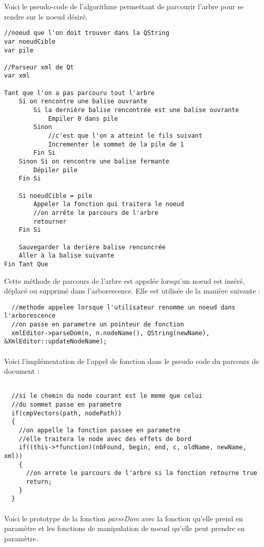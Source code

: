 Voici le pseudo-code de l'algorithme permettant de parcourir l'arbre pour se rendre sur le noeud désiré.

\begin{verbatim}
//noeud que l'on doit trouver dans la QString
var noeudCible
var pile

//Parseur xml de Qt
var xml

Tant que l'on a pas parcouru tout l'arbre
    Si on rencontre une balise ouvrante
        Si la dernière balise rencontrée est une balise ouvrante
            Empiler 0 dans pile
        Sinon
            //c'est que l'on a atteint le fils suivant
            Incrementer le sommet de la pile de 1
        Fin Si
    Sinon Si on rencontre une balise fermante
        Dépiler pile
    Fin Si
    
    Si noeudCible = pile
        Appeler la fonction qui traitera le noeud
        //on arrête le parcours de l'arbre
        retourner
    Fin Si
   
    Sauvegarder la derière balise renconcrée
    Aller à la balise suivante
Fin Tant Que
\end{verbatim}

Cette méthode de parcours de l'arbre est appelée lorsqu'un noeud est inséré, déplacé ou supprimé dans l'arborescence. Elle est utilisée de la manière suivante :

\begin{lstlisting}
  //methode appelee lorsque l'utilisateur renomme un noeud dans l'arborescence
  //on passe en parametre un pointeur de fonction
  xmlEditor->parseDom(n, n.nodeName(), QString(newName), &XmlEditor::updateNodeName);
\end{lstlisting}
\paragraph{}
Voici l'implémentation de l'appel de fonction dans le pseudo code du parcours de document :
\begin{lstlisting}
  
  //si le chemin du node courant est le meme que celui
  //du sommet passe en parametre
  if(cmpVectors(path, nodePath))
  {
    //on appelle la fonction passee en parametre
    //elle traitera le node avec des effets de bord
    if((this->*function)(nbFound, begin, end, c, oldName, newName, xml))
    {
      //on arrete le parcours de l'arbre si la fonction retourne true
      return;
    }
  }
\end{lstlisting}
\paragraph{}
Voici le prototype de la fonction \textit{parseDom} avec la fonction qu'elle prend en paramètre et les fonctions de manipulation de noeud qu'elle peut prendre en paramètre.

